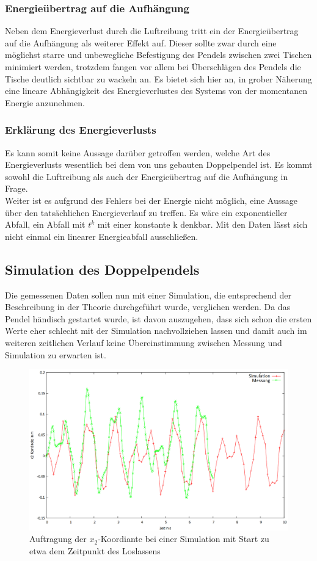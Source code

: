 \subsubsection{Energieübertrag auf die Aufhängung}
Neben dem Energieverlust durch die Luftreibung tritt ein der Energieübertrag auf die Aufhängung als weiterer Effekt auf. Dieser sollte zwar durch eine möglichst starre und unbewegliche Befestigung des Pendels zwischen zwei Tischen minimiert werden, trotzdem fangen vor allem bei Überschlägen des Pendels die Tische deutlich sichtbar zu wackeln an. 
Es bietet sich hier an, in grober Näherung eine lineare Abhängigkeit des Energieverlustes des Systems von der momentanen Energie anzunehmen. 

\subsubsection{Erklärung des Energieverlusts}
Es kann somit keine Aussage darüber getroffen werden, welche Art des Energieverlusts wesentlich bei dem von uns gebauten Doppelpendel ist. Es kommt sowohl die Luftreibung als auch der Energieübertrag auf die Aufhängung in Frage. \\
Weiter ist es aufgrund des Fehlers bei der Energie nicht möglich, eine Aussage über den tatsächlichen Energieverlauf zu treffen. Es wäre ein exponentieller Abfall, ein Abfall mit $t^k$ mit einer konstante k denkbar. Mit den Daten lässt sich nicht einmal ein linearer Energieabfall ausschließen. 

\subsection{Simulation des Doppelpendels}
Die gemessenen Daten sollen nun mit einer Simulation, die entsprechend der Beschreibung in der Theorie durchgeführt wurde, verglichen werden. Da das Pendel händisch gestartet wurde, ist davon auszugehen, dass sich schon die ersten Werte eher schlecht mit der Simulation nachvollziehen lassen und damit auch im weiteren zeitlichen Verlauf keine Übereinstimmung zwischen Messung und Simulation zu erwarten ist. 


\begin{figure}
        \includegraphics[width=.9\textwidth]{images/x2_ueber_t_beginn_neu.png}
\caption{Auftragung der $x_2$-Koordiante bei einer Simulation mit Start zu etwa dem Zeitpunkt des Loslassens}
\label{x2_ueber_t_alt}
\end{figure}


